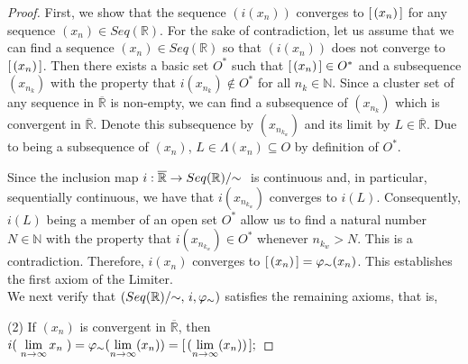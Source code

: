 \documentclass{amsart}
\theoremstyle{definition}
\theoremstyle{plain}
\begin{document}
\begin{proof}
 First, we show that the sequence $(i(x_n))$ converges to 
 $[\hspace{0.5mm}(x_n)\hspace{0.5mm}]$ for any sequence $(x_n) \in Seq(\mathbb{R}).$
For the sake of contradiction, let us assume that we can find a sequence $(x_n) \in Seq(\mathbb{R})$ so that $(i(x_n))$ does not converge to $[\hspace{0.5mm}(x_n)\hspace{0.5mm}]$. Then there exists a basic set $O^*$ such that $[\hspace{0.5mm}(x_n)\hspace{0.5mm}] \in O^*$
and a subsequence $(x_{n_k})$ with the property that $i(x_{n_k}) \not \in O^*$ for all $n_k \in \mathbb{N}$. 
Since a cluster set of any sequence in $\overline{\mathbb{R}}$ is non-empty, we can find a subsequence of $(x_{n_k})$ which is convergent in $\overline{\mathbb{R}}.$
Denote this subsequence by $(x_{n_{k_w}})$ and its limit by $L \in \overline{\mathbb{R}}$.
Due to being a subsequence of $(x_n)$, $L \in \Lambda(x_n) \subseteq O$ by definition of $O^*$.

Since the inclusion map $i: \overline{\mathbb{R}} \to Seq(\mathbb{R})/ \hspace{-1mm} \sim \hspace{1mm}$ is continuous and, in particular, sequentially continuous,  we have that $i(x_{n_{k_w}})$ converges to 
$i(L)$. Consequently, $i(L)$ being a member of an open set $O^*$ allow us to find a natural number $N \in \mathbb{N}$ with the property that $i(x_{n_{k_w}}) \in O^*$ whenever $n_{k_w} > N$. 
This is a contradiction. Therefore, $i(x_n)$ converges to $[ \hspace{0.5mm}(x_n) \hspace{0.5mm} ] = \varphi_{\sim}(x_n)$. This establishes the
first axiom of the Limiter. \\ 

We next verify that $(Seq(\mathbb{R})/\hspace{-1mm}\sim,\,i, \varphi_{\sim})$ satisfies the remaining axioms, that is,
\par\medskip
\hspace{5mm} (2) If $(x_n)$ is convergent in $\overline{\mathbb{R}}$, then $ \displaystyle i( \hspace{1mm} \lim_{n\to\infty} x_n \hspace{1mm}) = \varphi_{\sim}(\displaystyle \lim_{n \to \infty}(x_n)) = [\hspace{0.5mm}(\displaystyle \lim_{n \to \infty}(x_n))\hspace{0.5mm}];$


\end{proof}
\end{document}
